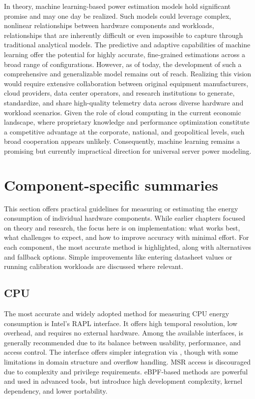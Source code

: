 In theory, machine learning-based power estimation models hold significant promise and may one day be realized. Such models could leverage complex, nonlinear relationships between hardware components and workloads, relationships that are inherently difficult or even impossible to capture through traditional analytical models. The predictive and adaptive capabilities of machine learning offer the potential for highly accurate, fine-grained estimations across a broad range of configurations. However, as of today, the development of such a comprehensive and generalizable model remains out of reach. Realizing this vision would require extensive collaboration between original equipment manufacturers, cloud providers, data center operators, and research institutions to generate, standardize, and share high-quality telemetry data across diverse hardware and workload scenarios. Given the role of cloud computing in the current economic landscape, where proprietary knowledge and performance optimization constitute a competitive advantage at the corporate, national, and geopolitical levels, such broad cooperation appears unlikely. Consequently, machine learning remains a promising but currently impractical direction for universal server power modeling.

\section{Component-specific summaries}
\label{sec:component_specific_summaries}

This section offers practical guidelines for measuring or estimating the energy consumption of individual hardware components. While earlier chapters focused on theory and research, the focus here is on implementation: what works best, what challenges to expect, and how to improve accuracy with minimal effort. For each component, the most accurate method is highlighted, along with alternatives and fallback options. Simple improvements like entering datasheet values or running calibration workloads are discussed where relevant.

\subsection{CPU}

The most accurate and widely adopted method for measuring CPU energy consumption is Intel's RAPL interface. It offers high temporal resolution, low overhead, and requires no external hardware. Among the available interfaces,  is generally recommended due to its balance between usability, performance, and access control. The  interface offers simpler integration via , though with some limitations in domain structure and overflow handling. MSR access is discouraged due to complexity and privilege requirements. eBPF-based methods are powerful and used in advanced tools, but introduce high development complexity, kernel dependency, and lower portability.

